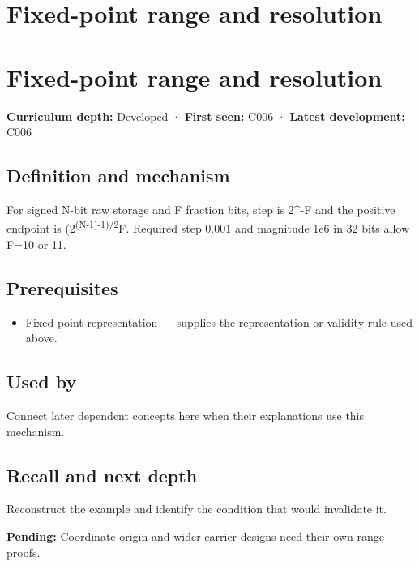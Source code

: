 \hypertarget{appendix-ceb4c4a9b5a1}{}
\section*{Fixed-point range and resolution}
\section{Fixed-point range and resolution}\label{fixed-point-range-and-resolution}

\textbf{Curriculum depth:} Developed · \textbf{First seen:} C006 · \textbf{Latest development:} C006

\subsection{Definition and mechanism}\label{definition-and-mechanism}

For signed N-bit raw storage and F fraction bits, step is 2\^{}-F and the positive endpoint is (2\textsuperscript{(N-1)-1)/2}F. Required step 0.001 and magnitude 1e6 in 32 bits allow F=10 or 11.

\subsection{Prerequisites}\label{prerequisites}

\begin{itemize}
\tightlist
\item
  \hyperref[appendix-1d0dbe8924cc]{Fixed-point representation} --- supplies the representation or validity rule used above.
\end{itemize}

\subsection{Used by}\label{used-by}

Connect later dependent concepts here when their explanations use this mechanism.

\subsection{Recall and next depth}\label{recall-and-next-depth}

Reconstruct the example and identify the condition that would invalidate it.

\textbf{Pending:} Coordinate-origin and wider-carrier designs need their own range proofs.

